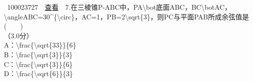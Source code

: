 \documentclass[]{article}
\begin{document}
~{{100023727}~~\href{../question/viewQuestionDetail.jsp?questionID=100023727\&testPaperId=100229072}{查看}~~7.在三棱锥P-ABC中，PA{\textbackslash{}bot}底面ABC，BC{\textbackslash{}bot}AC，{\textbackslash{}angle}ABC=30{\^{}\{\textbackslash{}circ\}}，AC=1，PB=2{\textbackslash{}sqrt\{3\}}，则PC与平面PAB所成余弦值是(　　)\\
\hspace*{0.333em}\hspace*{0.333em}（3.0分）\\
\hspace*{0.333em}\hspace*{0.333em}\hspace*{0.333em}\hspace*{0.333em}\hspace*{0.333em}\hspace*{0.333em}\hspace*{0.333em}\hspace*{0.333em}A：{\textbackslash{}frac\{\textbackslash{}sqrt\{33\}\}\{6\}}\\
\hspace*{0.333em}\hspace*{0.333em}\hspace*{0.333em}\hspace*{0.333em}\hspace*{0.333em}\hspace*{0.333em}\hspace*{0.333em}\hspace*{0.333em}B：{\textbackslash{}frac\{\textbackslash{}sqrt\{3\}\}\{3\}}\\
\hspace*{0.333em}\hspace*{0.333em}\hspace*{0.333em}\hspace*{0.333em}\hspace*{0.333em}\hspace*{0.333em}\hspace*{0.333em}\hspace*{0.333em}C：{\textbackslash{}frac\{\textbackslash{}sqrt\{3\}\}\{6\}}\\
\hspace*{0.333em}\hspace*{0.333em}\hspace*{0.333em}\hspace*{0.333em}\hspace*{0.333em}\hspace*{0.333em}\hspace*{0.333em}\hspace*{0.333em}D：{\textbackslash{}frac\{\textbackslash{}sqrt\{6\}\}\{3\}}\\
}
\end{document}
